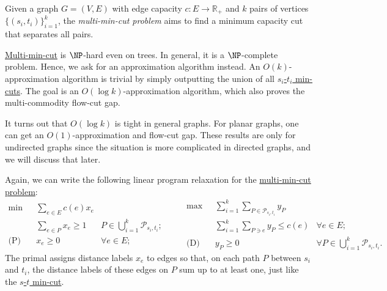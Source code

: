 \begin{problem}\label{prb:multi-min-cut}
Given a graph \(G = (V, E)\) with edge capacity \(c \colon E \to \mathbb{R} _+\) and \(k\) pairs of vertices \(\{ (s_i, t_i) \} _{i=1}^{k}\), the \emph{multi-min-cut problem} aims to find a minimum capacity cut that separates all pairs.
\end{problem}

\hyperref[prb:multi-min-cut]{Multi-min-cut} is \(\NP\)-hard even on trees. In general, it is a \(\NP\)-complete problem. Hence, we ask for an approximation algorithm instead. An \(O(k)\)-approximation algorithm is trivial by simply outputting the union of all \hyperref[prb:s-t-min-cut]{\(s_i\)-\(t_i\) min-cuts}. The goal is an \(O(\log k)\)-approximation algorithm, which also proves the multi-commodity flow-cut gap.

\begin{note}
	It turns out that \(O(\log k)\) is tight in general graphs. For planar graphs, one can get an \(O(1)\)-approximation and flow-cut gap. These results are only for undirected graphs since the situation is more complicated in directed graphs, and we will discuss that later.
\end{note}

Again, we can write the following linear program relaxation for the \hyperref[prb:multi-min-cut]{multi-min-cut problem}:
\begin{equation}\label{eq:multi-min-cut-LP}
	\begin{aligned}
		\min~           & \sum_{e \in E} c(e) x_e                                                      \\
		                & \sum_{e \in P} x_e \geq 1 & P \in \bigcup_{i=1}^{k} \mathcal{P}_{s_i, t_i} ; \\
		\text{(P)}\quad & x_e \geq 0                & \forall e \in E;
	\end{aligned}\qquad
	\begin{aligned}
		\max~           & \sum_{i=1}^{k} \sum_{P \in \mathcal{P}_{s_i, t_i}} y_P                                                           \\
		                & \sum_{i=1}^{k} \sum_{P \ni e} y_P \leq c(e)            & \forall e \in E ;                                       \\
		\text{(D)}\quad & y_P \geq 0                                             & \forall P \in \bigcup_{i=1}^{k} \mathcal{P}_{s_i, t_i}.
	\end{aligned}
\end{equation}
The primal assigns distance labels \(x_e\) to edges so that, on each path \(P\) between \(s_i\) and \(t_i\), the distance labels of these edges on \(P\) sum up to at least one, just like the \hyperref[prb:s-t-min-cut]{\(s\)-\(t\) min-cut}.

